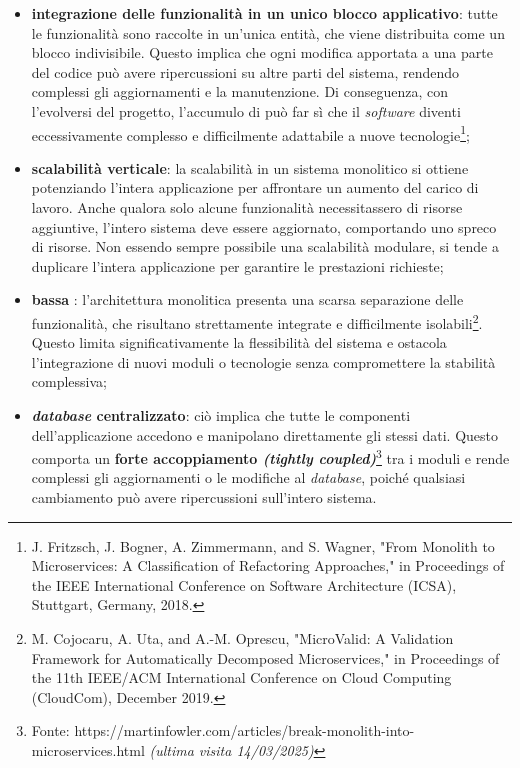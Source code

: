             \begin{itemize}
                \item \textbf{integrazione delle funzionalità in un unico blocco applicativo}: tutte le funzionalità sono raccolte in un’unica entità, che viene distribuita come un blocco indivisibile. Questo implica che ogni modifica apportata a una parte del codice può avere ripercussioni su altre parti del sistema, rendendo complessi gli aggiornamenti e la manutenzione. Di conseguenza, con l’evolversi del progetto, l’accumulo di  può far sì che il \textit{software} diventi eccessivamente complesso e difficilmente adattabile a nuove tecnologie\footnote{J. Fritzsch, J. Bogner, A. Zimmermann, and S. Wagner, "From Monolith to Microservices: A Classification of Refactoring Approaches," in Proceedings of the IEEE International Conference on Software Architecture (ICSA), Stuttgart, Germany, 2018.};
                \item  \textbf{scalabilità verticale}: la scalabilità in un sistema monolitico si ottiene potenziando l’intera applicazione per affrontare un aumento del carico di lavoro. Anche qualora solo alcune funzionalità necessitassero di risorse aggiuntive, l’intero sistema deve essere aggiornato, comportando uno spreco di risorse. Non essendo sempre possibile una scalabilità modulare, si tende a duplicare l’intera applicazione per garantire le prestazioni richieste;
                \item \textbf{bassa} : l’architettura monolitica presenta una scarsa separazione delle funzionalità, che risultano strettamente integrate e difficilmente isolabili\footnote{M. Cojocaru, A. Uta, and A.-M. Oprescu, "MicroValid: A Validation Framework for Automatically Decomposed Microservices," in Proceedings of the 11th IEEE/ACM International Conference on Cloud Computing (CloudCom), December 2019.}. Questo limita significativamente la flessibilità del sistema e ostacola l’integrazione di nuovi moduli o tecnologie senza compromettere la stabilità complessiva; 
                \item \textbf{\textit{database} centralizzato}: ciò implica che tutte le componenti dell’applicazione accedono e manipolano direttamente gli stessi dati. Questo comporta un \textbf{forte accoppiamento \textit{(tightly coupled)}}\footnote{Fonte: https://martinfowler.com/articles/break-monolith-into-microservices.html \textit{(ultima visita 14/03/2025)}} tra i moduli e rende complessi gli aggiornamenti o le modifiche al \textit{database}, poiché qualsiasi cambiamento può avere ripercussioni sull’intero sistema.
            \end{itemize}  

